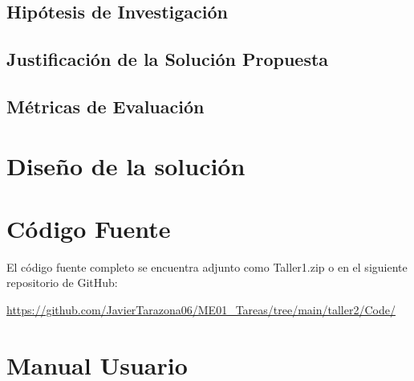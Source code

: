 \documentclass{article}
\begin{document}
\subsection{Hipótesis de Investigación}

\subsection{Justificación de la Solución Propuesta}


\subsection{Métricas de Evaluación}




\section{Diseño de la solución}\label{sec:disSol}



\section{Código Fuente}\label{sec:cod}

El código fuente completo se encuentra adjunto como Taller1.zip
o en el siguiente repositorio de GitHub:

\begin{center}
\url{https://github.com/JavierTarazona06/ME01_Tareas/tree/main/taller2/Code/}
\end{center}



\section{Manual Usuario}\label{sec:man_u}
\end{document}
